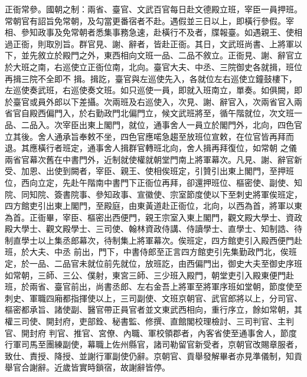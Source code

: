 \begin{pinyinscope}
 正衙常參。國朝之制：兩省、臺官、文武百官每日赴文德殿立班，宰臣一員押班。常朝官有詔旨免常朝，及勾當更番宿者不赴。遇假並三日以上，即橫行參假。宰相、參知政事及免常朝者悉集事務急速，赴橫行不及者，牒報臺。如遇親王、使相過正衙，則取別旨。群官見、謝、辭者，皆赴正衙。其日，文武班尚書、上將軍以下，並先敘立於殿門之外，東西相向文班一品、二品不敘立。正衙見、謝、辭官立於大班之南，右巡使立正衙位南，北向。臺官大夫、中丞、三院御史各就揖，班位再揖三院不全即不
 揖。揖訖，臺官與左巡使先入，各就位左右巡使立鐘鼓樓下，左巡使奏武班，右巡使奏文班。如只巡使一員，即就入班南立，單奏。如俱闕，即於臺官或員外郎以下差攝。次兩班及右巡使入，次見、謝、辭官入，次兩省官入兩省官自殿西偏門入，於右勤政門北偏門立，候文武班將至，循午階就位，次文班一品、二品入。次宰臣出東上閣門，就位，通事舍人一員立於閣門外，北向，四色官立其後。舍人通承旨奉敕不坐，四色官應喏急趨至放班位宣敕，在位官皆再拜而退。其應橫行者班定，通事舍人揖群官轉班北向，舍人揖再拜復位，如常朝
 之儀兩省官幕次舊在中書門外，近制就使權就朝堂門南上將軍幕次。凡見、謝、辭官新受、加恩、出使到闕者，宰臣、親王、使相俟班定，引贊引出東上閣門，至押班位，西向立定，先赴午階南中書門下正衙位再拜，卻還押班位、樞密使、副使、知院、同知院、簽書院事、參知政事、宣徽使、宗室節度使以下至刺史將軍俟班定，四方館吏引出東上閣門，至殿庭，由東黃道赴正衙位，北向，以西為首，將軍以東為首。正衙畢，宰臣、樞密出西便門，親王宗室入東上閣門，觀文殿大學士、資政殿大學士、觀文殿學士、三司使、翰林資政侍講、侍讀學士、直學士、知制誥、待制直學士以上集丞郎幕次，待制集上將軍幕次。俟班定，四方館吏引入殿西便門赴班，於大夫、中丞
 前出，門下，中書侍郎至正言四方館吏引先集勤政門北，俟班定，於一品、二品官未就位前先就位，放班訖，由西偏門出，御史大夫至御史序班如常朝，三師、三公、僕射，東宮三師、三少班入殿門，朝堂吏引入殿東便門赴班，於兩省、臺官前出，尚書丞郎、左右金吾上將軍至將軍序班如堂朝，節度使至刺史、軍職四廂都指揮使以上，三司副使、文班京朝官、武官郎將以上，分司官、樞密都承旨、諸使副、醫官帶正員官者並文東武西相向，重行序立，餘如常朝，其權三司使、開封府，吏部銓、秘書監、修撰、直館閣校理檢討、三司判官、主判官、開封府
 判官、推官、宮僚、內職、軍校領郡者，內客省使至通事舍人，節度行軍司馬至團練副使，幕職上佐州縣官，諸司勒留官新受者，京朝官改賜章服者，致仕、責授、降授、並謝行軍副使仍辭。京朝官、貢舉發解畢者亦見準儀制，知貢舉官合謝辭。近歲皆實時鎖宿，故謝辭皆停。




\end{pinyinscope}
